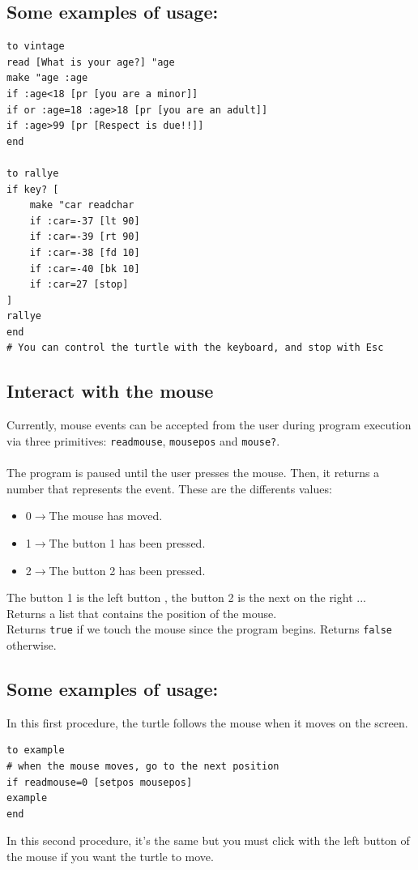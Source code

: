 \subsection{Some examples of usage:}

\begin{verbatim}
to vintage
read [What is your age?] "age
make "age :age
if :age<18 [pr [you are a minor]]
if or :age=18 :age>18 [pr [you are an adult]]
if :age>99 [pr [Respect is due!!]]
end

to rallye
if key? [
	make "car readchar
	if :car=-37 [lt 90]
	if :car=-39 [rt 90]
	if :car=-38 [fd 10]
	if :car=-40 [bk 10]
	if :car=27 [stop]
]
rallye
end
# You can control the turtle with the keyboard, and stop with Esc

\end{verbatim}
\subsection{Interact with the mouse}
Currently, mouse events can be accepted from the user during program execution via three primitives: \texttt{readmouse}, \texttt{mousepos} and \texttt{mouse?}. \\ \\
The program is paused until the user presses the mouse. Then, it returns a number that represents the event. These are the differents values:
\begin{itemize}
 \item 0$\to$The mouse has moved.
 \item 1$\to$The button 1 has been pressed.
 \item 2$\to$The button 2 has been pressed.
\end{itemize}
The button 1 is the left button , the button 2 is the next on the right ...\\
Returns a list that contains the position of the mouse.\\
Returns \texttt{true} if we touch the mouse since the program begins. Returns \texttt{false} otherwise.
\subsection{Some examples of usage:}
In this first procedure, the turtle follows the mouse when it moves on the screen.
\begin{verbatim}
to example
# when the mouse moves, go to the next position
if readmouse=0 [setpos mousepos]
example
end
\end{verbatim}
In this second procedure, it's the same but you must click with the left button of the mouse if you want the turtle to move.

